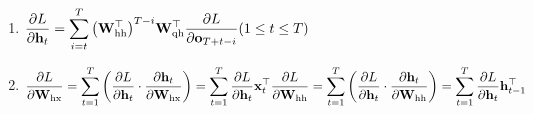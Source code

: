 \begin{enumerate}[itemsep=0.2cm]
    \item 
    $
        \dfrac{\partial L}{\partial \mathbf{h}_t}
        = \dsum_{i=t}^T {\left(\mathbf{W}_\textrm{hh}^\top\right)}^{T-i} \mathbf{W}_\textrm{qh}^\top \dfrac{\partial L}{\partial \mathbf{o}_{T+t-i}}
        \hfill
        (1 \leq t \leq T)
    $

    \item 
    $
        \dfrac{\partial L}{\partial \mathbf{W}_\textrm{hx}}
        = \dsum_{t=1}^T \left(\dfrac{\partial L}{\partial \mathbf{h}_t} \cdot \dfrac{\partial \mathbf{h}_t}{\partial \mathbf{W}_\textrm{hx}}\right)
        = \dsum_{t=1}^T \dfrac{\partial L}{\partial \mathbf{h}_t} \mathbf{x}_t^\top
        \hfill
        \dfrac{\partial L}{\partial \mathbf{W}_\textrm{hh}}
        = \dsum_{t=1}^T \left(\dfrac{\partial L}{\partial \mathbf{h}_t} \cdot \dfrac{\partial \mathbf{h}_t}{\partial \mathbf{W}_\textrm{hh}}\right)
        = \dsum_{t=1}^T \dfrac{\partial L}{\partial \mathbf{h}_t} \mathbf{h}_{t-1}^\top
        \hfill
    $

    
\end{enumerate}

















